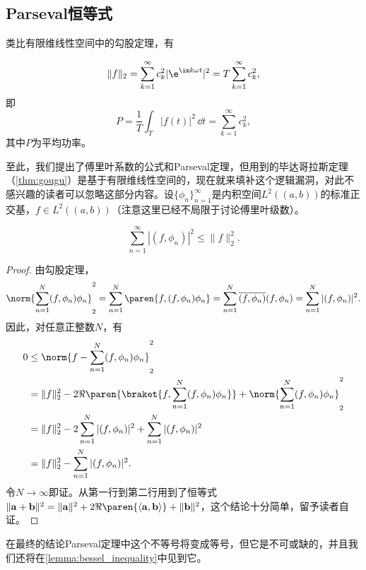 \subsection{Parseval恒等式}\label{sub:paseval}
类比有限维线性空间中的勾股定理，有
\begin{theorem}
    \begin{equation}
        \|f\|_2=\sum_{k=1}^{\infty}c_k^2|\e^{\im k\omega t}|^2=T\sum_{k=1}^{\infty}c_k^2,
    \end{equation}
    即
    \begin{equation}
        P=\frac{1}{T}\int_{T}|f(t)|^2\,\dd t=\sum_{k=1}^{\infty}c_k^2,
    \end{equation}
    其中$P$为平均功率。
\end{theorem}
至此，我们提出了傅里叶系数的公式和Parseval定理，但用到的毕达哥拉斯定理（\cref{thm:gougu}）是基于有限维线性空间的，现在就来填补这个逻辑漏洞，对此不感兴趣的读者可以忽略这部分内容。设$\{\phi_n\}_{n=1}^{\infty}$是内积空间$L^2((a,b))$的标准正交基，$f\in L^2((a,b))$（注意这里已经不局限于讨论傅里叶级数）。

\begin{lemma}[*Bessel不等式]
    \begin{equation}
        \sum_{n=1}^{\infty}|(f,\phi_n)|^2\leq\|f\|_2^2.
    \end{equation}
\end{lemma}
\begin{proof}
    由勾股定理，
    \begin{equation}
        \norm{\sum_{n=1}^{N}(f,\phi_n)\phi_n}_2^2= \sum_{n=1}^{N}\paren{f,(f,\phi_n)\phi_n}=\sum_{n=1}^{N}\overline{(f,\phi_n)}(f,\phi_n)=\sum_{n=1}^{N}|(f,\phi_n)|^2.
    \end{equation}
    因此，对任意正整数$N$，有
    \begin{align}
         0&\leq\norm{f-\sum_{n=1}^{N}(f,\phi_n)\phi_n}_2^2\nonumber\\
         &=\|f\|_2^2-2\Re\paren{\braket{f,\sum_{n=1}^{N}(f,\phi_n)\phi_n}}+\norm{\sum_{n=1}^{N}(f,\phi_n)\phi_n}_2^2\nonumber \\
         &=\|f\|_2^2-2\sum_{n=1}^{N}|(f,\phi_n)|^2+\sum_{n=1}^{N}|(f,\phi_n)|^2\nonumber\\
         &=\|f\|_2^2-\sum_{n=1}^{N}|(f,\phi_n)|^2.
    \end{align}
    令$N\to\infty$即证。从第一行到第二行用到了恒等式$\|\mathbf{a}+\mathbf{b}\|^2=\|\mathbf{a}\|^2+2\Re\paren{\langle\mathbf{a},\mathbf{b}\rangle}+\|\mathbf{b}\|^2$，这个结论十分简单，留予读者自证。
\end{proof}
在最终的结论Parseval定理中这个不等号将变成等号，但它是不可或缺的，并且我们还将在\cref{lemma:bessel_inequality}中见到它。

